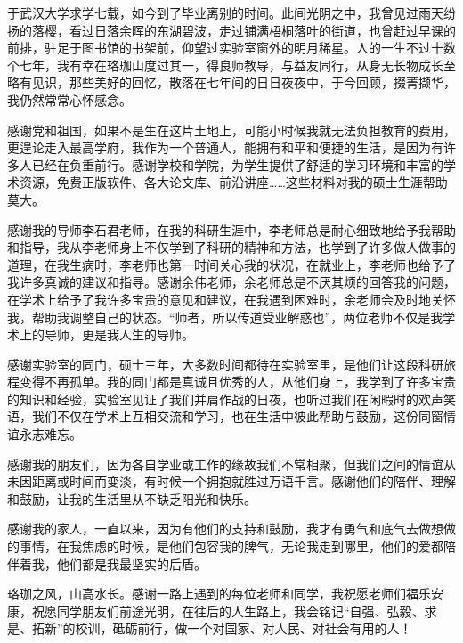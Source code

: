 
于武汉大学求学七载，如今到了毕业离别的时间。此间光阴之中，我曾见过雨天纷扬的落樱，看过日落余晖的东湖碧波，走过铺满梧桐落叶的街道，也曾赶过早课的前排，驻足于图书馆的书架前，仰望过实验室窗外的明月稀星。人的一生不过十数个七年，我有幸在珞珈山度过其一，得良师教导，与益友同行，从身无长物成长至略有见识，那些美好的回忆，散落在七年间的日日夜夜中，于今回顾，掇菁撷华，我仍然常常心怀感念。

感谢党和祖国，如果不是生在这片土地上，可能小时候我就无法负担教育的费用，更遑论走入最高学府，我作为一个普通人，能拥有和平和便捷的生活，是因为有许多人已经在负重前行。感谢学校和学院，为学生提供了舒适的学习环境和丰富的学术资源，免费正版软件、各大论文库、前沿讲座……这些材料对我的硕士生涯帮助莫大。

感谢我的导师李石君老师，在我的科研生涯中，李老师总是耐心细致地给予我帮助和指导，我从李老师身上不仅学到了科研的精神和方法，也学到了许多做人做事的道理，在我生病时，李老师也第一时间关心我的状况，在就业上，李老师也给予了我许多真诚的建议和指导。感谢余伟老师，余老师总是不厌其烦的回答我的问题，在学术上给予了我许多宝贵的意见和建议，在我遇到困难时，余老师会及时地关怀我，帮助我调整自己的状态。“师者，所以传道受业解惑也”，两位老师不仅是我学术上的导师，更是我人生的导师。

感谢实验室的同门，硕士三年，大多数时间都待在实验室里，是他们让这段科研旅程变得不再孤单。我的同门都是真诚且优秀的人，从他们身上，我学到了许多宝贵的知识和经验，实验室见证了我们并肩作战的日夜，也听过我们在闲暇时的欢声笑语，我们不仅在学术上互相交流和学习，也在生活中彼此帮助与鼓励，这份同窗情谊永志难忘。

感谢我的朋友们，因为各自学业或工作的缘故我们不常相聚，但我们之间的情谊从未因距离或时间而变淡，有时候一个拥抱就胜过万语千言。感谢他们的陪伴、理解和鼓励，让我的生活里从不缺乏阳光和快乐。

感谢我的家人，一直以来，因为有他们的支持和鼓励，我才有勇气和底气去做想做的事情，在我焦虑的时候，是他们包容我的脾气，无论我走到哪里，他们的爱都陪伴着我，他们都是我最坚实的后盾。


珞珈之风，山高水长。感谢一路上遇到的每位老师和同学，我祝愿老师们福乐安康，祝愿同学朋友们前途光明，在往后的人生路上，我会铭记“自强、弘毅、求是、拓新”的校训，砥砺前行，做一个对国家、对人民、对社会有用的人！